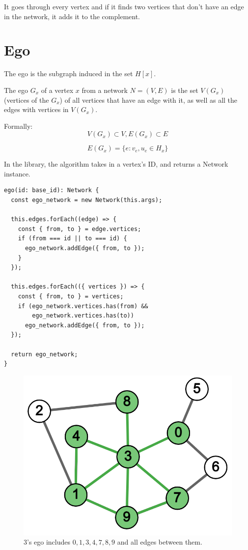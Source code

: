 It goes through every vertex and if it finds two vertices that don't have an edge in the network,
it adds it to the complement.

\section{Ego}

The ego is the subgraph induced in the set $H[x]$.

The ego $G_x$ of a vertex $x$ from a network $N=(V,E)$ is the set $V(G_x)$ (vertices of the $G_x$)
of all vertices that have an edge with it, as well as all the edges with vertices in $V(G_x)$.

Formally:
$$V(G_x) \subset V, E(G_x) \subset E$$

$$E(G_x)=\{e : v_e,u_e \in H_x\}$$

In the library, the algorithm takes in a vertex's ID, and returns a Network instance.
\begin{verbatim}
ego(id: base_id): Network {
  const ego_network = new Network(this.args);

  this.edges.forEach((edge) => {
    const { from, to } = edge.vertices;
    if (from === id || to === id) {
      ego_network.addEdge({ from, to });
    }
  });

  this.edges.forEach(({ vertices }) => {
    const { from, to } = vertices;
    if (ego_network.vertices.has(from) &&
        ego_network.vertices.has(to))
      ego_network.addEdge({ from, to });
  });

  return ego_network;
}
\end{verbatim}

\begin{figure}[H]
  \centering
  \includegraphics[scale=.25]{img/ego_3.png}
  \caption{3's ego includes $0,1,3,4,7,8,9$ and all edges between them.}
  \label{fig:core_ex}
\end{figure}

